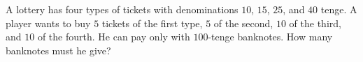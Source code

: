A lottery has four types of tickets with denominations $10$, $15$, $25$, and $40$ tenge. A player wants to buy $5$ tickets of the first type, $5$ of the second, $10$ of the third, and $10$ of the fourth. He can pay only with $100$-tenge banknotes. How many banknotes must he give?
